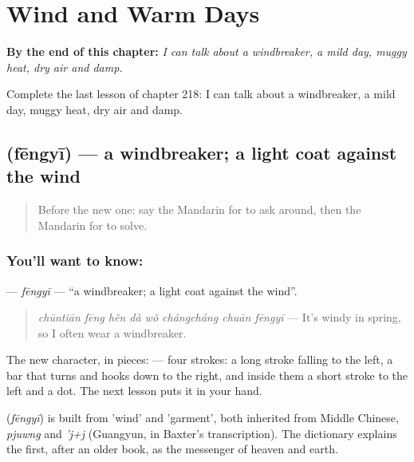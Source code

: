 
\chapter{Wind and Warm Days}
\label{ch:zh-wind-and-warm-days}

\begin{chapteropening}
\textbf{By the end of this chapter:} \emph{I can talk about a windbreaker, a mild day, muggy heat, dry air and damp.}

Complete the last lesson of chapter 218: I can talk about a windbreaker, a mild day, muggy heat, dry air and damp.
\end{chapteropening}

\section[\texorpdfstring{\zh{风衣} (fēngyī)}{风衣 (fēngyī)}]{ (fēngyī) — a windbreaker; a light coat against the wind}

\label{lesson:ZH-C218-fengyi}



\begin{quote}
Before the new one: say the Mandarin for to ask around, then the Mandarin for to solve.
\end{quote}

\subsection*{You'll want to know: }
\textbf{} — \emph{fēngyī} — \textquotedblleft{}a windbreaker; a light coat against the wind\textquotedblright{}.

\begin{quote}
\emph{chūntiān fēng hěn dà wǒ chángcháng chuān fēngyī} — It's windy in spring, so I often wear a windbreaker.
\end{quote}

The new character, in pieces:  — four strokes: a long stroke falling to the left, a bar that turns and hooks down to the right, and inside them a short stroke to the left and a dot. The next lesson puts it in your hand.

\begin{cousinweb}
\textbf{} (\emph{fēngyī}) is built from  'wind' and  'garment', both inherited from Middle Chinese, \emph{pjuwng} and \emph{'j+j} (Guangyun, in Baxter's transcription). The dictionary explains the first, after an older book, as the messenger of heaven and earth.
\end{cousinweb}

